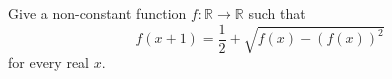 Give a non-constant function $f : \mathbb{R} \to \mathbb{R}$ such that
\[
f(x+1) = \frac{1}{2} + \sqrt{f(x) - (f(x))^2}
\]
for every real $x$.
